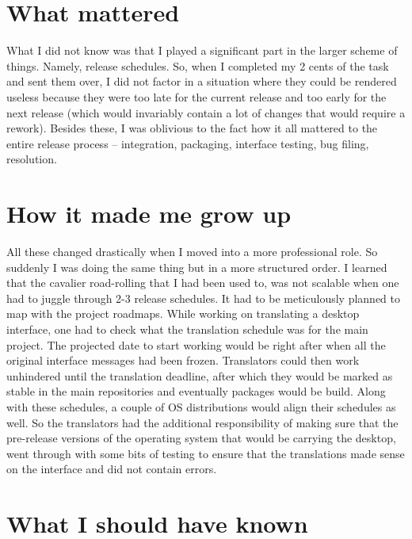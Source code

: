\section*{What mattered}

What I did not know was that I played a significant part in the larger scheme of
things. Namely, release schedules. So, when I completed my 2 cents of the task
and sent them over, I did not factor in a situation where they could be rendered
useless because they were too late for the current release and too early for the
next release (which would invariably contain a lot of changes that would require
a rework). Besides these, I was oblivious to the fact how it all mattered to the
entire release process -- integration, packaging, interface testing, bug filing,
resolution.

\section*{How it made me grow up}

All these changed drastically when I moved into a more professional role. So
suddenly I was doing the same thing but in a more structured order. I learned
that the cavalier road-rolling that I had been used to, was not scalable when
one had to juggle through 2-3 release schedules. It had to be meticulously
planned to map with the project roadmaps. While working on translating a desktop
interface, one had to check what the translation schedule was for the main
project. The projected date to start working would be right after when all the
original interface messages had been frozen. Translators could then work
unhindered until the translation deadline, after which they would be marked as
stable in the main repositories and eventually packages would be build. Along
with these schedules, a couple of OS
distributions would align their schedules as well. So the translators had the
additional responsibility of making sure that the pre-release versions of the
operating system that would be carrying the desktop, went through with some bits
of testing to ensure that the translations made sense on the interface and did
not contain errors.

\section*{What I should have known}

